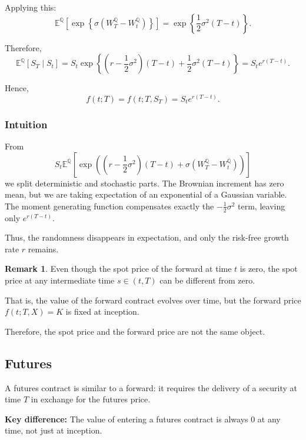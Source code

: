 \documentclass[12pt,a4paper]{article}
\theoremstyle{definition}
\newtheorem{remark}{Remark}[section]
\newcommand{\Q}{\mathbb{Q}}
\newcommand{\E}{\mathbb{E}}
\begin{document}
Applying this:
\[
\E^\Q\left[\exp\left\{\sigma(W_T^\Q - W_t^\Q)\right\}\right] = \exp\left\{\frac{1}{2}\sigma^2(T-t)\right\}.
\]

Therefore,
\[
\E^\Q[S_T \mid S_t] = S_t \exp\left\{\left(r - \frac{1}{2}\sigma^2\right)(T-t) + \frac{1}{2}\sigma^2(T-t)\right\} = S_t e^{r(T-t)}.
\]

Hence,
\[
f(t; T) = f(t; T, S_T) = S_t e^{r(T-t)}.
\]

\begin{center}
\end{center}

\subsubsection{Intuition}

From
\[
S_t \E^\Q\left[\exp\left(\left(r - \frac{1}{2}\sigma^2\right)(T-t) + \sigma(W_T^\Q - W_t^\Q)\right)\right]
\]
we split deterministic and stochastic parts. The Brownian increment has zero mean, but we are taking expectation of an exponential of a Gaussian variable. The moment generating function compensates exactly the $-\frac{1}{2}\sigma^2$ term, leaving only $e^{r(T-t)}$.

Thus, the randomness disappears in expectation, and only the risk-free growth rate $r$ remains.

\begin{remark}
Even though the spot price of the forward at time $t$ is zero, the spot price at any intermediate time $s \in (t, T)$ can be different from zero.

That is, the value of the forward contract evolves over time, but the forward price $f(t; T, X) = K$ is fixed at inception.

Therefore, the spot price and the forward price are not the same object.
\end{remark}

\subsection{Futures}

A futures contract is similar to a forward: it requires the delivery of a security at time $T$ in exchange for the futures price.

\textbf{Key difference:}
The value of entering a futures contract is always 0 at any time, not just at inception.
\end{document}
